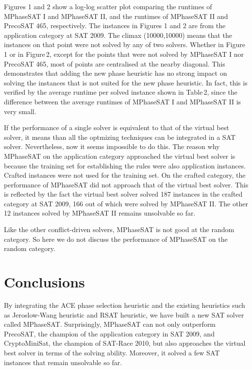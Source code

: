 \documentclass{llncs}
\begin{document}
Figures 1 and 2 show a log-log scatter plot comparing the runtimes
of \linebreak
 MPhaseSAT I and MPhaseSAT II, and the runtimes of MPhaseSAT II
and PrecoSAT 465, respectively. The instances in Figures 1 and 2 are
from the application category at SAT 2009. The climax (10000,10000)
means that the instances on that point were not solved by any of two
solvers. Whether in Figure\,1 or in Figure\,2, except for the points
that were not solved by MPhaseSAT I nor PrecoSAT 465, most of points
are centralised at the nearby diagonal. This demonstrates that
adding the new phase heuristic has no strong impact on solving the
instances that is not suited for the new phase heuristic. In fact,
this is verified by the average runtime per solved instance shown in
Table\,2, since the difference between the average runtimes of
MPhaseSAT I and MPhaseSAT II is very small.

If the performance of a single solver is equivalent to that of the
virtual best solver, it means than all the optmizing techniques can
be integrated in a SAT solver. Nevertheless, now it seems impossible
to do this. The reason why MPhaseSAT on the application category
approached the virtual best solver is because the training set for
establishing the rules were also application instances. Crafted
instances were not used for the training set. On the crafted
category, the performance of MPhaseSAT did not approach that of the
virtual best solver. This is reflected by the fact the virtual best
solver solved 187 instances in the crafted category at SAT 2009, 166
out of which were solved by MPhaseSAT II. The other 12 instances
solved by MPhaseSAT II remains unsolvable so far.

Like the other conflict-driven solvers, MPhaseSAT is not good at the
random category. So here we do not discuss the performance of
MPhaseSAT on the random category.

\section {Conclusions}
By integrating the ACE phase selection heuristic and the existing
heuristics such as Jeroslow-Wang heuristic and RSAT heuristic, we
have built a new SAT solver called MPhaseSAT. Surprisingly,
MPhaseSAT can not only outperform PrecoSAT, the champion of the
application category in SAT 2009, and CryptoMiniSat, the champion of
SAT-Race 2010, but also approaches the virtual best solver in terms
of the solving ability. Moreover, it solved a few SAT instances that
remain unsolvable so far.
\end{document}
